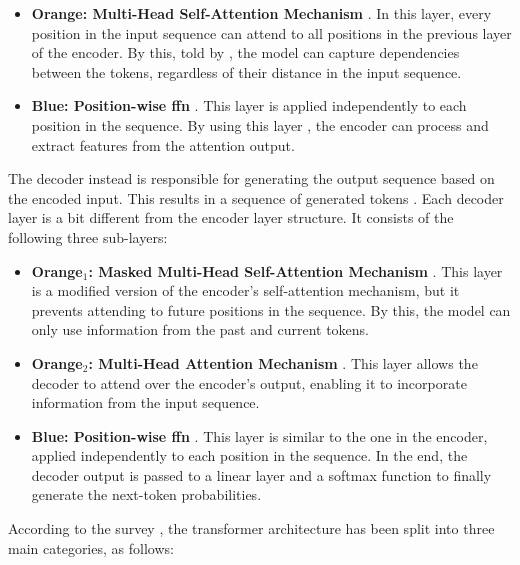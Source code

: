 \begin{itemize}
    \item \textbf{Orange: Multi-Head Self-Attention Mechanism} \cite{vaswani_attention_2017}. In this layer, every position in the input sequence can attend to all positions in the previous layer of the encoder. By this, told by \cite{patil_review_2024}, the model can capture dependencies between the tokens, regardless of their distance in the input sequence. 
    \item \textbf{Blue: Position-wise \ac{ffn}} \cite{vaswani_attention_2017}. This layer is applied independently to each position in the sequence. By using this layer \cite{liu_understanding_2024}, the encoder can process and extract features from the attention output.
\end{itemize}

 The decoder instead is responsible for generating the output sequence based on the encoded input. This results in a sequence of generated tokens \cite{raiaan_review_2024}. Each decoder layer is a bit different from the encoder layer structure. It consists of the following three sub-layers:

\begin{itemize}
    \item \textbf{Orange$_1$: Masked Multi-Head Self-Attention Mechanism} \cite{vaswani_attention_2017}. This layer is a modified version of the encoder's self-attention mechanism, but it prevents attending to future positions in the sequence. By this, the model can only use information from the past and current tokens.
    \item \textbf{Orange$_2$: Multi-Head Attention Mechanism} \cite{vaswani_attention_2017}. This layer allows the decoder to attend over the encoder's output, enabling it to incorporate information from the input sequence.
    \item \textbf{Blue: Position-wise \ac{ffn}} \cite{vaswani_attention_2017}. This layer is similar to the one in the encoder, applied independently to each position in the sequence. In the end, the decoder output is passed to a linear layer and a softmax function to finally generate the next-token probabilities.
\end{itemize}

\pagebreak

 According to the survey \cite{shao_survey_2024}, the transformer architecture has been split into three main categories, as follows:

